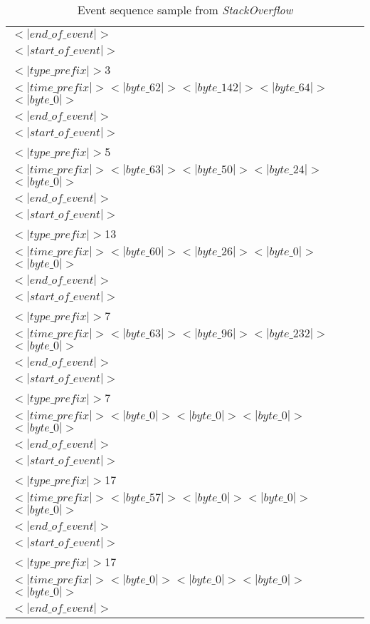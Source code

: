 \begin{table}[h]
\begin{tabular}{|p{}|}
$<|end\_of\_event|>$ \\
$<|start\_of\_event|>$ \\
$<|type\_prefix|>$3 \\
$<|time\_prefix|>$$<|byte\_62|>$$<|byte\_142|>$$<|byte\_64|>$$<|byte\_0|>$ \\
$<|end\_of\_event|>$ \\
$<|start\_of\_event|>$ \\
$<|type\_prefix|>$5 \\
$<|time\_prefix|>$$<|byte\_63|>$$<|byte\_50|>$$<|byte\_24|>$$<|byte\_0|>$ \\
$<|end\_of\_event|>$ \\
$<|start\_of\_event|>$ \\
$<|type\_prefix|>$13 \\
$<|time\_prefix|>$$<|byte\_60|>$$<|byte\_26|>$$<|byte\_0|>$$<|byte\_0|>$ \\
$<|end\_of\_event|>$ \\
$<|start\_of\_event|>$ \\
$<|type\_prefix|>$7 \\
$<|time\_prefix|>$$<|byte\_63|>$$<|byte\_96|>$$<|byte\_232|>$$<|byte\_0|>$ \\
$<|end\_of\_event|>$ \\
$<|start\_of\_event|>$ \\
$<|type\_prefix|>$7 \\
$<|time\_prefix|>$$<|byte\_0|>$$<|byte\_0|>$$<|byte\_0|>$$<|byte\_0|>$ \\
$<|end\_of\_event|>$ \\
$<|start\_of\_event|>$ \\
$<|type\_prefix|>$17 \\
$<|time\_prefix|>$$<|byte\_57|>$$<|byte\_0|>$$<|byte\_0|>$$<|byte\_0|>$ \\
$<|end\_of\_event|>$ \\
$<|start\_of\_event|>$ \\
$<|type\_prefix|>$17 \\
$<|time\_prefix|>$$<|byte\_0|>$$<|byte\_0|>$$<|byte\_0|>$$<|byte\_0|>$ \\
$<|end\_of\_event|>$ \\
\hline
\end{tabular}
\caption{Event sequence sample from \textit{StackOverflow}}\label{tab:event_sample_2}
\end{table}

